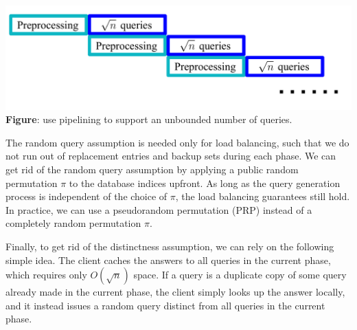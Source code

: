 \begin{center}
    \includegraphics[scale=0.6]{piano-pipeline.pdf}\\[-10pt]
{\bf Figure}: use pipelining to support an unbounded number of queries.
\end{center}


The random query assumption is needed
only for load balancing, such that we do not run out of 
replacement entries and backup sets during each phase.
We can get rid of the random query assumption 
by applying a public random permutation 
$\pi$
to the database indices upfront.
As long as the query generation process is independent
of the choice of $\pi$, the load balancing guarantees still hold.
In practice, we can use a pseudorandom permutation (PRP) 
instead of a completely random permutation $\pi$.

Finally, to get rid of the distinctness assumption, 
we can rely on the following simple idea. 
The client caches the answers to all queries in the current phase, which
requires only $O(\sqrt{n})$ space.
If a query is a duplicate copy of some query already made in the current phase,
the client simply looks up the answer locally, and it instead issues
a random query  
distinct from all queries in the current phase.

